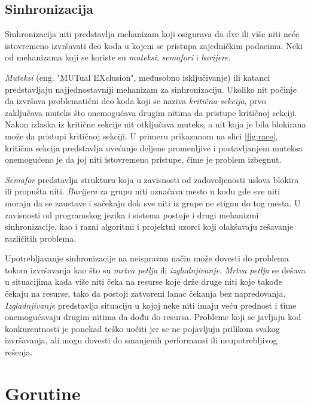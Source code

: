 \documentclass[12pt,oneside]{memoir}
\begin{document}
\subsection{Sinhronizacija}

Sinhronizacija niti predstavlja mehanizam koji osigurava da dve ili više niti neće istovremeno izvršavati deo koda u kojem se pristupa zajedničkim podacima. Neki od mehanizama koji se koriste su \textit{muteksi}, \textit{semafori} i \textit{barijere}. 

\textit{Muteksi} (eng. "MUTual EXclusion", međusobno isključivanje) ili katanci predstavljaju najjednostavniji mehanizam za sinhronizaciju. Ukoliko nit počinje da izvršava problematični deo koda koji se naziva \textit{kritična sekcija}, prvo zaključava muteks što onemogućava drugim nitima da pristupe kritičnoj sekciji. Nakon izlaska iz kritične sekcije nit otključava muteks, a nit koja je bila blokirana može da pristupi kritičnoj sekciji. U primeru prikazanom na slici \ref{fig:race}, kritična sekcija predstavlja uvećanje deljene promenljive i postavljanjem muteksa onemogućeno je da joj niti istovremeno pristupe, čime je problem izbegnut. 

\textit{Semafor} predstavlja strukturu koja u zavisnosti od zadovoljenosti uslova blokira ili propušta niti. \textit{Barijera} za grupu niti označava mesto u kodu gde sve niti moraju da se zaustave i sačekaju dok sve niti iz grupe ne stignu do tog mesta. U zavisnosti od programskog jezika i sistema postoje i drugi mehanizmi sinhronizacije, kao i razni algoritmi i projektni uzorci koji olakšavaju rešavanje različitih problema.

Upotrebljavanje sinhronizacije na neispravan način može dovesti do problema  tokom izvršavanja kao što su \textit{mrtva petlja} ili \textit{izgladnjivanje}. \textit{Mrtva petlja} se dešava u situacijima kada više niti čeka na resurse koje drže druge niti koje takođe čekaju na resurse, tako da postoji zatvoreni lanac čekanja bez napredovanja. \textit{Izgladnjivanje} predstavlja situaciju u kojoj neke niti imaju veću prednost i time onemogućavaju drugim nitima da dođu do resursa. Probleme koji se javljaju kod konkurentnosti je ponekad teško uočiti jer se ne pojavljuju prilikom svakog izvršavanja, ali mogu dovesti do smanjenih performansi ili neupotrebljivog rešenja. 

\section{Gorutine} \label{gorut}
\end{document}
